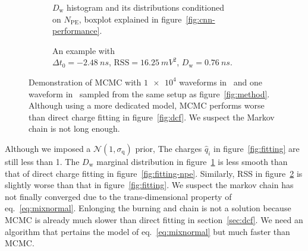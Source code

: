 \begin{figure}[H]
  \begin{subfigure}{.5\textwidth}
    \centering
    \resizebox{\textwidth}{!}{}
    \caption{\label{fig:mcmc-npe} $D_\mathrm{w}$ histogram and its distributions conditioned \\ on $N_{\mathrm{PE}}$, boxplot explained in figure~\ref{fig:cnn-performance}.}
  \end{subfigure}
  \begin{subfigure}{.5\textwidth}
    \centering
    \resizebox{\textwidth}{!}{}
    \caption{\label{fig:mcmc}An example with \\ $\Delta{t_0}=\SI{-2.48}{ns}$, $\mathrm{RSS}=\SI{16.25}{mV^2}$, $D_\mathrm{w}=\SI{0.76}{ns}$.}
  \end{subfigure}
  \caption{\label{fig:mcmc-performance}Demonstration of MCMC with $\num[retain-unity-mantissa=false]{1e4}$ waveforms in~ and one waveform in~ sampled from the same setup as figure~\ref{fig:method}.  Although using a more dedicated model, MCMC performs worse than direct charge fitting in figure~\ref{fig:dcf}. We suspect the Markov chain is not long enough.}
\end{figure}
Although we imposed a $\mathcal{N}(1, \sigma_\mathrm{q})$ prior, The charges $\hat{q}_i$ in figure~\ref{fig:fitting} are still less than 1.  The $D_\mathrm{w}$ marginal distribution in figure~\ref{fig:mcmc-npe} is less smooth than that of direct charge fitting in figure~\ref{fig:fitting-npe}.  Similarly, RSS in figure~\ref{fig:mcmc} is slightly worse than that in figure~\ref{fig:fitting}.  We suspect the markov chain has not finally converged due to the trans-dimensional property of eq.~\eqref{eq:mixnormal}.  Enlonging the burning and chain is not a solution because MCMC is already much slower than direct fitting in section~\ref{sec:dcf}.  We need an algorithm that pertains the model of eq.~\eqref{eq:mixnormal} but much faster than MCMC.

